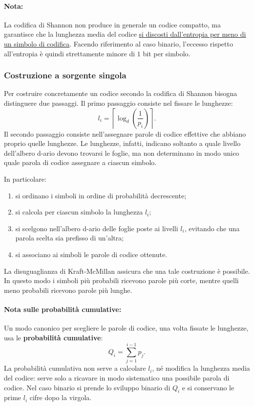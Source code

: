 \documentclass{article}
\theoremstyle{definition}
\numberwithin{equation}{section}
\begin{document}
\paragraph{Nota:}
La codifica di Shannon non produce in generale un codice compatto, ma garantisce che la lunghezza media del codice \uline{si discosti dall'entropia per meno di un simbolo di codifica}. Facendo riferimento al caso binario, l'eccesso rispetto all'entropia è quindi strettamente minore di $1$ bit per simbolo.

\subsubsection{Costruzione a sorgente singola}
Per costruire concretamente un codice secondo la codifica di Shannon bisogna distinguere due passaggi. Il primo passaggio consiste nel fissare le lunghezze:
\[
    l_i = \left\lceil \log_d\!\left(\frac{1}{p_i}\right) \right\rceil.
\]
Il secondo passaggio consiste nell'assegnare parole di codice effettive che abbiano proprio quelle lunghezze. Le lunghezze, infatti, indicano soltanto a quale livello dell'albero d-ario devono trovarsi le foglie, ma non determinano in modo unico quale parola di codice assegnare a ciascun simbolo.

In particolare:
\begin{enumerate}
    \item si ordinano i simboli in ordine di probabilità decrescente;
    \item si calcola per ciascun simbolo la lunghezza $l_i$;
    \item si scelgono nell'albero d-ario delle foglie poste ai livelli $l_i$, evitando che una parola scelta sia prefisso di un'altra;
    \item si associano ai simboli le parole di codice ottenute.
\end{enumerate}

La disuguaglianza di Kraft-McMillan assicura che una tale costruzione è possibile. In questo modo i simboli più probabili ricevono parole più corte, mentre quelli meno probabili ricevono parole più lunghe.

\paragraph{Nota sulle probabilità cumulative:}
Un modo canonico per scegliere le parole di codice, una volta fissate le lunghezze, usa le \textbf{probabilità cumulative}:
\[
    Q_i = \sum_{j=1}^{i-1} p_j.
\]
La probabilità cumulativa non serve a calcolare $l_i$, né modifica la lunghezza media del codice: serve solo a ricavare in modo sistematico una possibile parola di codice. Nel caso binario si prende lo sviluppo binario di $Q_i$ e si conservano le prime $l_i$ cifre dopo la virgola.
\end{document}
